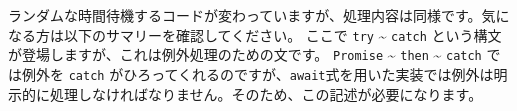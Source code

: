 \begin{Shaded}
\begin{Highlighting}[]
  \NormalTok{ () \{}
  \OperatorTok{=}  \NormalTok{()}\OperatorTok{;}
  \OperatorTok{=} \NormalTok{(}\NormalTok{() }\OperatorTok{*} \NormalTok{)}\OperatorTok{;}
  \NormalTok{ (}\NormalTok{) \{}
    \NormalTok{() }\OperatorTok{+}\OperatorTok{\textless{}}\NormalTok{ (} \NormalTok{()}\NormalTok{())) }\OperatorTok{;}
\NormalTok{  \}}
  \OperatorTok{\%}  \OperatorTok{===} \NormalTok{) \{}
     \VerbatimStringTok{\textasciigrave{}}\SpecialCharTok{$\{}\SpecialCharTok{\}}\OperatorTok{;}
\NormalTok{  \} }\NormalTok{ \{}
     \NormalTok{(}\VerbatimStringTok{\textasciigrave{}}\SpecialCharTok{$\{}\SpecialCharTok{\}}\NormalTok{)}\OperatorTok{;}
\NormalTok{  \}}
\NormalTok{\}}

\NormalTok{ \{}
  \OperatorTok{=}  \NormalTok{()}\OperatorTok{;}
  \NormalTok{(}\SpecialCharTok{$\{}\SpecialCharTok{\}}\VerbatimStringTok{\textasciigrave{}}\NormalTok{)}\OperatorTok{;}
\NormalTok{\} }
  \NormalTok{(}\SpecialCharTok{$\{}\SpecialCharTok{\}}\VerbatimStringTok{\textasciigrave{}}\NormalTok{)}\OperatorTok{;}
\NormalTok{\}}
\end{Highlighting}
\end{Shaded}

ランダムな時間待機するコードが変わっていますが、処理内容は同様です。気になる方は以下のサマリーを確認してください。
ここで \texttt{try} \textasciitilde{} \texttt{catch}
という構文が登場しますが、これは例外処理のための文です。
\texttt{Promise} \textasciitilde{} \texttt{then} \textasciitilde{}
\texttt{catch} では例外を \texttt{catch}
がひろってくれるのですが、\texttt{await}式を用いた実装では例外は明示的に処理しなければなりません。そのため、この記述が必要になります。

